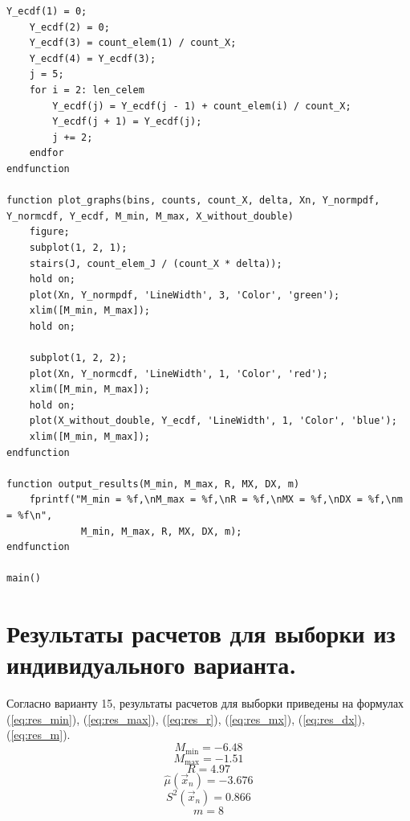 \begin{lstlisting}[label=lst:code, caption=Модуль разработанных алгоритмов, basicstyle=\footnotesize]
	Y_ecdf(1) = 0;
	Y_ecdf(2) = 0;
	Y_ecdf(3) = count_elem(1) / count_X;
	Y_ecdf(4) = Y_ecdf(3);
	j = 5;
	for i = 2: len_celem
		Y_ecdf(j) = Y_ecdf(j - 1) + count_elem(i) / count_X;
		Y_ecdf(j + 1) = Y_ecdf(j);
		j += 2;
	endfor
endfunction

function plot_graphs(bins, counts, count_X, delta, Xn, Y_normpdf, Y_normcdf, Y_ecdf, M_min, M_max, X_without_double)
	figure;
	subplot(1, 2, 1);
	stairs(J, count_elem_J / (count_X * delta));
	hold on;
	plot(Xn, Y_normpdf, 'LineWidth', 3, 'Color', 'green');
	xlim([M_min, M_max]);
	hold on;
	
	subplot(1, 2, 2);
	plot(Xn, Y_normcdf, 'LineWidth', 1, 'Color', 'red');
	xlim([M_min, M_max]);
	hold on;
	plot(X_without_double, Y_ecdf, 'LineWidth', 1, 'Color', 'blue');
	xlim([M_min, M_max]);
endfunction

function output_results(M_min, M_max, R, MX, DX, m)
	fprintf("M_min = %f,\nM_max = %f,\nR = %f,\nMX = %f,\nDX = %f,\nm = %f\n",
			 M_min, M_max, R, MX, DX, m);
endfunction

main()
\end{lstlisting}

\newpage
\section{Результаты расчетов для выборки из индивидуального варианта.}
Согласно варианту 15, результаты расчетов для выборки приведены на формулах (\ref{eq:res_min}), (\ref{eq:res_max}), (\ref{eq:res_r}), (\ref{eq:res_mx}), (\ref{eq:res_dx}), (\ref{eq:res_m}).
\begin{equation}
	\label{eq:res_min}
	M_{\min} = -6.48
\end{equation}
\begin{equation}
	\label{eq:res_max}
	M_{\max} = -1.51
\end{equation}
\begin{equation}
	\label{eq:res_r}
	R = 4.97
\end{equation}
\begin{equation}
	\label{eq:res_mx}
	\hat\mu(\vec x_n) = -3.676
\end{equation}
\begin{equation}
	\label{eq:res_dx}
	S^2(\vec x_n) = 0.866
\end{equation}
\begin{equation}
	\label{eq:res_m}
	m = 8
\end{equation}

